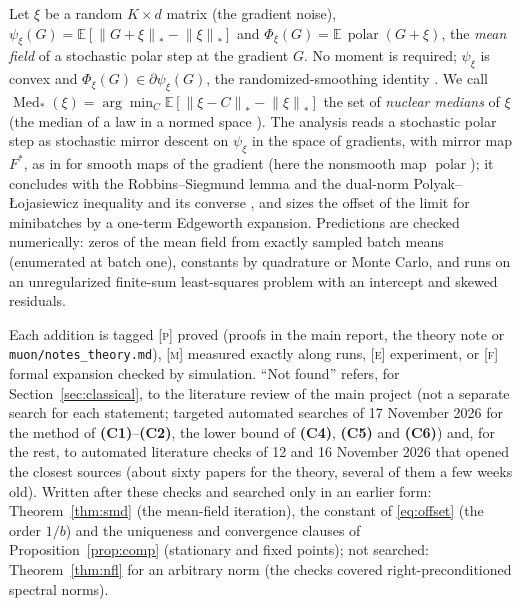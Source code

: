 \documentclass[10pt]{article}
\makeatletter
\renewcommand\subsection{\@startsection{subsection}{2}{\z@}{-1.8ex\@plus -0.5ex \@minus -.2ex}{0.8ex \@plus .2ex}{\normalfont\normalsize\bfseries}}
\newcommand{\E}{\mathbb{E}}
\newcommand{\nnuc}[1]{\left\|#1\right\|_{*}}
\newcommand{\polar}{\operatorname{polar}}
\newcommand{\Med}{\operatorname{Med}_\ast}
\newcommand{\finding}[1]{\textbf{(#1)}}
\newcommand{\nat}[1]{\textsc{[#1]}}
\makeatother
\begin{document}
Let $\xi$ be a random $K\times d$ matrix (the gradient noise), $\psi_\xi(G)=\E[\nnuc{G+\xi}-\nnuc\xi]$ and
$\Phi_\xi(G)=\E\,\polar(G+\xi)$, the \emph{mean field} of a stochastic polar step at the gradient $G$. No moment is
required; $\psi_\xi$ is convex and $\Phi_\xi(G)\in\partial\psi_\xi(G)$, the randomized-smoothing identity
\cite{duchi2012randomized,jiang2026adaptive}. We call $\Med(\xi)=\arg\min_C\E[\nnuc{\xi-C}-\nnuc\xi]$ the set of
\emph{nuclear medians} of $\xi$ (the median of a law in a normed space \cite{minsker2015geometric}). The analysis
reads a stochastic polar step as stochastic mirror descent on $\psi_\xi$ in the space of gradients, with mirror map
$F^\ast$, as in \cite{maddison2021dual} for smooth maps of the gradient (here the nonsmooth map $\polar$); it concludes
with the Robbins--Siegmund lemma and the dual-norm Polyak--\L{}ojasiewicz inequality and its converse
\cite{balles2020geometry,leplat2025norm}, and sizes the offset of the limit for minibatches by a one-term Edgeworth
expansion. Predictions are checked numerically: zeros of the mean field from exactly sampled batch means (enumerated at batch one), constants by quadrature or Monte Carlo, and runs on an unregularized finite-sum least-squares problem with an intercept and
skewed residuals.

\subsection{Status of the claims}\label{sec:status}

Each addition is tagged \nat{p} proved (proofs in the main report, the theory note or \texttt{muon/notes\_theory.md}),
\nat{m} measured exactly along runs, \nat{e} experiment, or \nat{f} formal expansion checked by simulation. ``Not
found'' refers, for Section~\ref{sec:classical}, to the literature review of the main project (not a separate search
for each statement; targeted automated searches of 17 November 2026 for the method of \finding{C1}--\finding{C2}, the lower
bound of \finding{C4}, \finding{C5} and \finding{C6}) and, for the rest, to automated literature checks of 12 and 16
November 2026 that opened the closest sources (about sixty papers for the theory, several of them a few weeks old).
Written after these checks and searched only in an earlier form: Theorem~\ref{thm:smd} (the mean-field iteration), the
constant of \eqref{eq:offset} (the order $1/b$) and the uniqueness and convergence clauses of
Proposition~\ref{prop:comp} (stationary and fixed points); not searched: Theorem~\ref{thm:nfl} for an arbitrary norm
(the checks covered right-preconditioned spectral norms).
\end{document}
